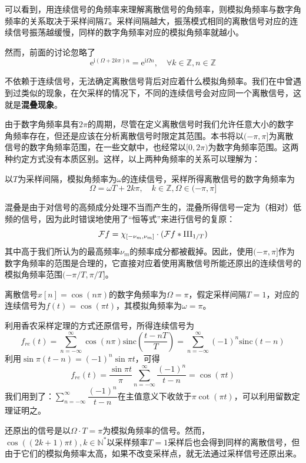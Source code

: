 可以看到，用连续信号的角频率来理解离散信号的角频率，则模拟角频率与数字角频率的关系取决于采样间隔$T$。采样间隔越大，振荡模式相同的离散信号对应的连续信号振荡越缓慢，同样的数字角频率对应的模拟角频率就越小。

然而，前面的讨论忽略了
$$\mathrm{e}^{\mathrm{i}(\Omega+2k\pi)n}=\mathrm{e}^{\mathrm{i}\Omega n},\quad \forall k\in\mathbb{Z},n\in\mathbb{Z}$$

不依赖于连续信号，无法确定离散信号背后对应着什么模拟角频率。我们在中曾遇到过类似的现象，在欠采样的情况下，不同的连续信号会对应同一个离散信号，这就是\textbf{混叠现象}。

由于数字角频率具有$2\pi$的周期，尽管在定义离散信号时我们允许任意大小的数字角频率存在，但还是应该在分析离散信号时限定其范围。本书将以$(-\pi,\pi]$为离散信号的数字角频率范围\cite{signal_systems}，在一些文献中，也经常以$[0,2\pi)$为数字角频率范围。这两种约定方式没有本质区别。这样，以上两种角频率的关系可以理解为：

\begin{proposition}
以$T$为采样间隔，模拟角频率为$\omega$的连续信号，采样所得离散信号的数字角频率为
\[\Omega=\omega T+2k\pi,\quad k\in\mathbb{Z},\Omega\in(-\pi,\pi]\]
\end{proposition}

混叠是由于对信号的高频成分处理不当而产生的，混叠所得信号一定为（相对）低频的信号，因为此时错误地使用了“恒等式”来进行信号的复原：
\[\mathcal{F} f=\chi_{[-\nu_m,\nu_m]}\cdot (\mathcal{F} f*\operatorname{III}_{1/T})\]
其中高于我们所认为的最高频率$\nu_m$的频率成分都被截掉。因此，使用$(-\pi,\pi]$作为数字角频率的范围是合理的，它直接对应着使用离散信号所能还原出的连续信号的模拟角频率范围$(-\pi/T,\pi/T]$。

\begin{example}
    离散信号$x[n]=\cos(n\pi)$的数字角频率为$\Omega=\pi$，假定采样间隔$T=1$，对应的连续信号为$f(t)=\cos(\pi t)$，其模拟角频率为$\omega=\pi$。

    利用香农采样定理的方式还原信号，所得连续信号为
    \[f_{re}(t)=\sum_{n=-\infty}^{\infty}\cos(n\pi)\mathrm{sinc}\left(\frac{t-nT}{T}\right)=\sum_{n=-\infty}^{\infty}(-1)^n\mathrm{sinc}\left(t-n\right)\]
    利用$\sin\pi(t-n)=(-1)^n\sin\pi t$，可得
    \[f_{re}(t)=\frac{\sin\pi t}{\pi}\sum_{n=-\infty}^{\infty}\frac{(-1)^n}{t-n}=\cos(\pi t)\]
    我们用到了：$\sum_{n=-\infty}^{\infty}\dfrac{(-1)^n}{t-n}$在主值意义下收敛于$\pi\cot(\pi t)$，可以利用留数定理证明之。

    还原出的信号是以$\Omega\cdot T=\pi$为模拟角频率的信号。然而，$\cos((2k+1)\pi t),k\in\mathbb{N}^*$以采样频率$T=1$采样后也会得到同样的离散信号，但由于它们的模拟角频率太高，如果不改变采样点，就无法通过采样信号还原出来。
\end{example}

